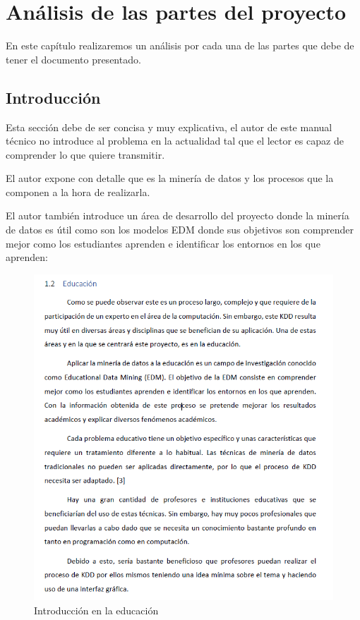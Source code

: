 \chapter{Análisis de las partes del proyecto}
En este capítulo realizaremos un análisis por cada una de las partes que debe de tener el documento presentado.

\section{Introducción}

Esta sección debe de ser concisa y muy explicativa, el autor de este manual técnico no introduce al problema en la actualidad tal que el lector es capaz de comprender lo que quiere transmitir.

El autor expone con detalle que es la minería de datos y los procesos que la componen a la hora de realizarla.

El autor también introduce un área de desarrollo del proyecto donde la minería de datos es útil como son los modelos EDM donde sus objetivos son comprender mejor como los estudiantes aprenden e identificar los entornos en los que aprenden:

\begin{figure}[H]
  \includegraphics[scale=0.7]{capitulos/img/img1.PNG}
  \caption{Introducción en la educación}
  \label{fig:img1}
\end{figure}

